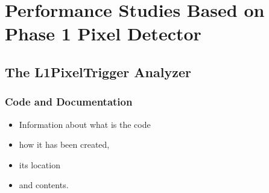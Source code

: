 \documentclass[a4paper,12pt,oneside]{article}
\newcommand{\exodiboson} {\textsc{exodiboson}\xspace}
\begin{document}




\section{Performance Studies Based on Phase 1 Pixel Detector}

        \subsection{The L1PixelTrigger Analyzer}

                   \subsubsection{Code and Documentation}

                   \begin{itemize}
                   \item Information about what is the code
                   \item how it has been created,
                   \item its location
                   \item and contents.
                   \end{itemize}
\end{document}
